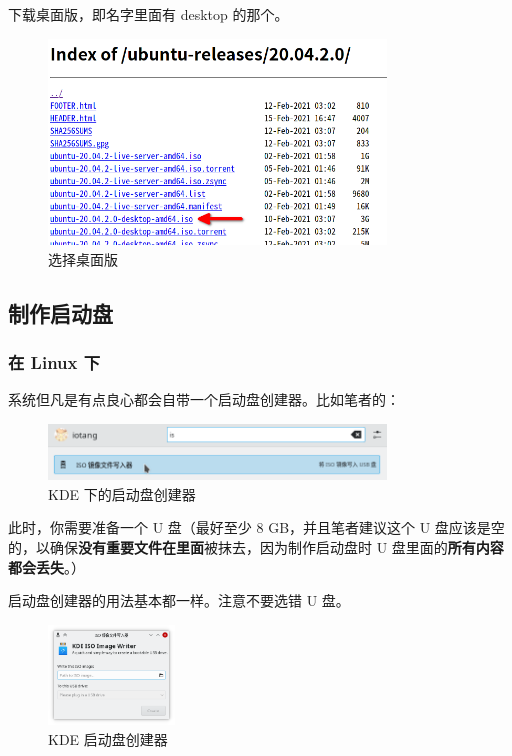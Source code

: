 \documentclass[UTF-8]{ctexart}
\begin{document}
				下载桌面版，即名字里面有 desktop 的那个。
				
				\begin{figure}[H]
					\centering
					\includegraphics[width=0.8\textwidth]{fig/mirrors163com_choose_ubuntu-releases.png}
					\caption*{选择桌面版}
				\end{figure}
			
		\subsection{制作启动盘}
		
			\subsubsection{在 Linux 下}
			
				系统但凡是有点良心都会自带一个启动盘创建器。比如笔者的：
			
				\begin{figure}[H]
					\centering
					\includegraphics[width=0.8\textwidth]{fig/iso_burn.png}
					\caption*{KDE 下的启动盘创建器}
				\end{figure}
				
				此时，你需要准备一个 U 盘（最好至少 8 GB，并且笔者建议这个 U 盘应该是空的，以确保\textbf{\large 没有重要文件在里面}被抹去，因为制作启动盘时 U 盘里面的\textbf{\large 所有内容都会丢失}。）
				
				启动盘创建器的用法基本都一样。注意不要选错 U 盘。
			
				\begin{figure}[H]
					\centering
					\includegraphics[width=0.3\textwidth]{fig/isoimagewriter.png}
					\caption*{KDE 启动盘创建器}
				\end{figure}
\end{document}
